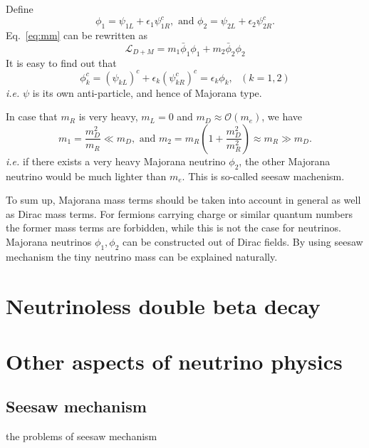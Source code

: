 Define
\begin{equation}
  \label{eq:mafi}
  \phi_{1} = \psi_{1L} + \epsilon_{1}\psi^{c}_{1R}, 
  \mbox{\ \ \ and \ \ \ }
  \phi_{2} = \psi_{2L} + \epsilon_{2}\psi^{c}_{2R}.
\end{equation}
Eq.~\ref{eq:mm} can be rewritten as
\begin{equation}
  \label{eq:mv}
  \mathcal{L}_{D+M} = m_{1}\bar{\phi}_{1}\phi_{1} + m_{2}\bar{\phi}_{2}\phi_{2}
\end{equation}
It is easy to find out that
\begin{equation}
  \label{eq:mach}
  \phi^{c}_{k} = (\psi_{kL})^{c} + \epsilon_{k}(\psi^{c}_{kR})^{c} = \epsilon_{k}\phi_{k}, ~~~ (k=1,2)
\end{equation}
\textit{i.e.} $\psi$ is its own anti-particle, and hence of Majorana type.

In case that $m_{R}$ is very heavy, $m_{L} = 0$ and $m_{D} \approx \mathcal{O}(m_{e})$, we have
\begin{equation}
  \label{eq:mach}
  m_{1} = \frac{m^{2}_{D}}{m_{R}}\ll m_{D},  \mbox{\ \ \ and \ \ \ }   m_{2} = m_{R}(1+\frac{m^{2}_{D}}{m^{2}_{R}}) \approx m_{R} \gg m_{D}.
\end{equation}
\textit{i.e.} if there exists a very heavy Majorana neutrino $\phi_2$, the other Majorana neutrino would be much lighter than $m_e$. This is so-called seesaw machenism.

To sum up, Majorana mass terms should be taken into account in general as well as Dirac mass terms. For fermions carrying charge or similar quantum numbers the former mass terms are forbidden, while this is not the case for neutrinos. Majorana neutrinos $\phi_{1}, \phi_{2}$ can be constructed out of Dirac fields. By using seesaw mechanism the tiny neutrino mass can be explained naturally.

\section{Neutrinoless double beta decay}
\label{sec:0n2b}


\section{Other aspects of neutrino physics}
\label{sec:others}

\subsection{Seesaw mechanism}
\label{sec:seesaw}
the problems of seesaw mechanism


